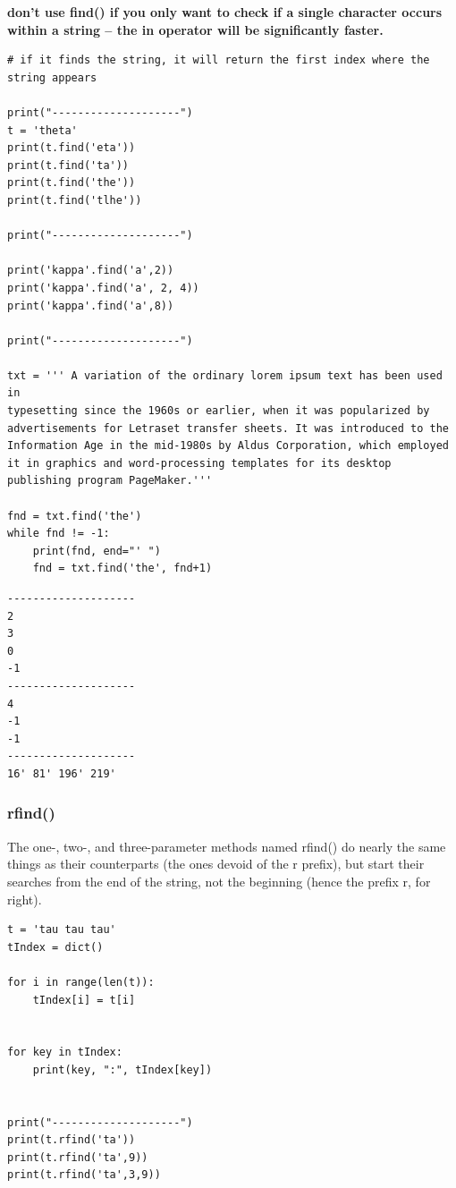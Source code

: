 \documentclass[11pt]{article}
\begin{document}
\textbf{don’t use find() if you only want to check if a single character
occurs within a string – the in operator will be significantly faster.}

\begin{verbatim}
# if it finds the string, it will return the first index where the string appears 

print("--------------------")
t = 'theta'
print(t.find('eta'))
print(t.find('ta'))
print(t.find('the'))
print(t.find('tlhe'))

print("--------------------")

print('kappa'.find('a',2))
print('kappa'.find('a', 2, 4))
print('kappa'.find('a',8))

print("--------------------")

txt = ''' A variation of the ordinary lorem ipsum text has been used in
typesetting since the 1960s or earlier, when it was popularized by
advertisements for Letraset transfer sheets. It was introduced to the
Information Age in the mid-1980s by Aldus Corporation, which employed
it in graphics and word-processing templates for its desktop
publishing program PageMaker.'''

fnd = txt.find('the')
while fnd != -1:
    print(fnd, end="' ")
    fnd = txt.find('the', fnd+1)
\end{verbatim}

\begin{verbatim}
--------------------
2
3
0
-1
--------------------
4
-1
-1
--------------------
16' 81' 196' 219' 
\end{verbatim}

\subsubsection{rfind()}
\label{sec:orge742332}
The one-, two-, and three-parameter methods named rfind() do nearly
the same things as their counterparts (the ones devoid of the r
prefix), but start their searches from the end of the string, not the
beginning (hence the prefix r, for right).

\begin{verbatim}
t = 'tau tau tau'
tIndex = dict()

for i in range(len(t)):
    tIndex[i] = t[i]


for key in tIndex:
    print(key, ":", tIndex[key])


print("--------------------")
print(t.rfind('ta'))
print(t.rfind('ta',9))
print(t.rfind('ta',3,9))
\end{verbatim}
\end{document}
